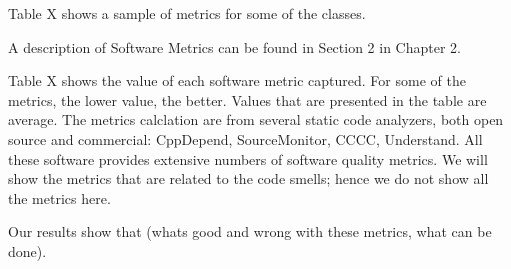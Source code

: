Table X shows a sample of metrics for some of the classes. 


A description of Software Metrics can be found in Section 2 in Chapter 2. 

Table X shows the value of each software metric captured. For some of the metrics, the lower value, the better. Values that are presented in the table are average. The metrics calclation are from several static code analyzers, both open source and commercial: CppDepend, SourceMonitor, CCCC, Understand. All these software provides extensive numbers of software quality metrics. We will show the metrics that are related to the code smells; hence we do not show all the metrics here. 

Our results show that (whats good and wrong with these metrics, what can be done). 


































